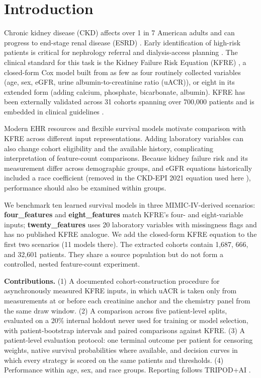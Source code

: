 \section{Introduction}\label{sec:intro}

Chronic kidney disease (CKD) affects over 1 in 7 American adults and can progress to end-stage renal disease (ESRD) \citep{CDC2023CKD}. Early identification of high-risk patients is critical for nephrology referral and dialysis-access planning \citep{levin2011early_detection}. The clinical standard for this task is the Kidney Failure Risk Equation (KFRE) \citep{tangri2011predicting}, a closed-form Cox model built from as few as four routinely collected variables (age, sex, eGFR, urine albumin-to-creatinine ratio (uACR)), or eight in its extended form (adding calcium, phosphate, bicarbonate, albumin). KFRE has been externally validated across 31 cohorts spanning over 700{,}000 patients \citep{tangri2016multinational} and is embedded in clinical guidelines \citep{major2019kfre_external_validation}.

Modern EHR resources and flexible survival models motivate comparison with KFRE across different input representations. Adding laboratory variables can also change cohort eligibility and the available history, complicating interpretation of feature-count comparisons. Because kidney failure risk and its measurement differ across demographic groups, and eGFR equations historically included a race coefficient (removed in the CKD-EPI 2021 equation used here \citep{inker2021ckdepi}), performance should also be examined within groups.

We benchmark ten learned survival models in three MIMIC-IV-derived scenarios: \textbf{four\_features} and \textbf{eight\_features} match KFRE's four- and eight-variable inputs; \textbf{twenty\_features} uses 20 laboratory variables with missingness flags and has no published KFRE analogue. We add the closed-form KFRE equation to the first two scenarios (11 models there). The extracted cohorts contain 1{,}687, 666, and 32{,}601 patients. They share a source population but do not form a controlled, nested feature-count experiment.

\textbf{Contributions.} (1) A documented cohort-construction procedure for asynchronously measured KFRE inputs, in which uACR is taken only from measurements at or before each creatinine anchor and the chemistry panel from the same draw window. (2) A comparison across five patient-level splits, evaluated on a 20\% internal holdout never used for training or model selection, with patient-bootstrap intervals and paired comparisons against KFRE. (3) A patient-level evaluation protocol: one terminal outcome per patient for censoring weights, native survival probabilities where available, and decision curves in which every strategy is scored on the same patients and thresholds. (4) Performance within age, sex, and race groups. Reporting follows TRIPOD+AI \citep{collins2024tripodai}.
